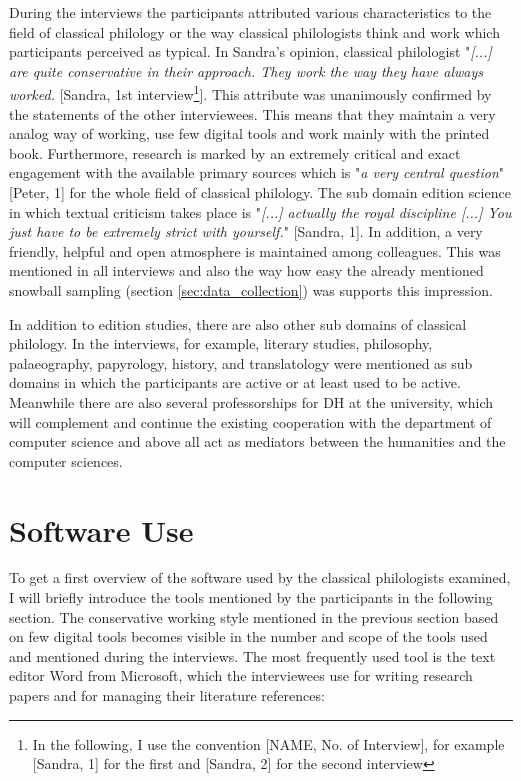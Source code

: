 \documentclass[12pt, a4paper, titlepage, oneside, abstract=true, toc=listof, toc=bibliography]{scrreprt}
\begin{document}
During the interviews the participants attributed various characteristics to the field of classical philology or the way classical philologists think and work which participants perceived as typical. %
In Sandra's opinion, classical philologist "\textit{[...] are quite conservative in their approach. They work the way they have always worked.} [Sandra, 1st interview\footnote{In the following, I use the convention [NAME, No. of Interview], for example [Sandra, 1] for the first and [Sandra, 2] for the second interview}]. This attribute was unanimously confirmed by the statements of the other interviewees. This means that they maintain a very analog way of working, use few digital tools and work mainly with the printed book. %
Furthermore, research is marked by an extremely critical and exact engagement with the available primary sources which is "\textit{a very central question}" [Peter, 1] for the whole field of classical philology. The sub domain edition science in which textual criticism takes place is "\textit{[...] actually the royal discipline [...] You just have to be extremely strict with yourself.}" [Sandra, 1]. In addition, a very friendly, helpful and open atmosphere is maintained among colleagues. This was mentioned in all interviews and also the way how easy the already mentioned snowball sampling (section \ref{sec:data_collection}) was supports this impression.

In addition to edition studies, there are also other sub domains of classical philology. In the interviews, for example, literary studies, philosophy, palaeography, papyrology, history, and translatology were mentioned as sub domains in which the participants are active or at least used to be active. Meanwhile there are also several professorships for \gls{DH} at the university, which will complement and continue the existing cooperation with the department of computer science and above all act as mediators between the humanities and the computer sciences. 

\section{Software Use}
\label{sec:SW_use}
To get a first overview of the software used by the classical philologists examined, I will briefly introduce the tools mentioned by the participants in the following section.
The conservative working style mentioned in the previous section based on few digital tools becomes visible in the number and scope of the tools used and mentioned during the interviews. The most frequently used tool is the text editor \gls{Word} from Microsoft, which the interviewees use for writing research papers and for managing their literature references:
\end{document}

